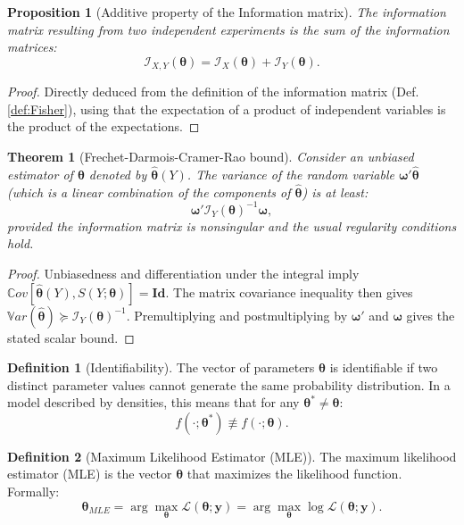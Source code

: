 \documentclass[
  11pt,
]{book}
\newtheorem{theorem}{Theorem}[chapter]
\newtheorem{proposition}{Proposition}[chapter]
\theoremstyle{definition}
\newtheorem{definition}{Definition}[chapter]
\theoremstyle{definition}
\theoremstyle{definition}
\theoremstyle{definition}
\theoremstyle{remark}
\begin{document}
\begin{proposition}[Additive property of the Information matrix]
\protect\hypertarget{prp:additiv}{}\label{prp:additiv}The information matrix resulting from two independent experiments is the sum of the information matrices:
\[
\mathcal{I}_{X,Y}(\boldsymbol\theta) = \mathcal{I}_X(\boldsymbol\theta) + \mathcal{I}_Y(\boldsymbol\theta).
\]
\end{proposition}

\begin{proof}
Directly deduced from the definition of the information matrix (Def. \ref{def:Fisher}), using that the expectation of a product of independent variables is the product of the expectations.
\end{proof}

\begin{theorem}[Frechet-Darmois-Cramer-Rao bound]
\protect\hypertarget{thm:FDCR}{}\label{thm:FDCR}Consider an unbiased estimator of \(\boldsymbol\theta\) denoted by \(\hat{\boldsymbol\theta}(Y)\). The variance of the random variable \(\boldsymbol\omega'\hat{\boldsymbol\theta}\) (which is a linear combination of the components of \(\hat{\boldsymbol\theta}\)) is at least:
\[
\boldsymbol\omega'\mathcal{I}_Y(\boldsymbol\theta)^{-1}\boldsymbol\omega,
\]
provided the information matrix is nonsingular and the usual regularity conditions hold.
\end{theorem}

\begin{proof}
Unbiasedness and differentiation under the integral imply \(\mathbb{C}ov[\hat{\boldsymbol\theta}(Y),S(Y;\boldsymbol\theta)]=\mathbf{Id}\). The matrix covariance inequality then gives \(\mathbb{V}ar(\hat{\boldsymbol\theta})\succeq\mathcal{I}_Y(\boldsymbol\theta)^{-1}\). Premultiplying and postmultiplying by \(\boldsymbol\omega'\) and \(\boldsymbol\omega\) gives the stated scalar bound.
\end{proof}

\begin{definition}[Identifiability]
\protect\hypertarget{def:identif}{}\label{def:identif}The vector of parameters \(\boldsymbol\theta\) is identifiable if two distinct parameter values cannot generate the same probability distribution. In a model described by densities, this means that for any \(\boldsymbol\theta^*\ne\boldsymbol\theta\):
\[
f(\cdot;\boldsymbol\theta^*)\not\equiv f(\cdot;\boldsymbol\theta).
\]
\end{definition}

\begin{definition}[Maximum Likelihood Estimator (MLE)]
\protect\hypertarget{def:MLEest}{}\label{def:MLEest}The maximum likelihood estimator (MLE) is the vector \(\boldsymbol\theta\) that maximizes the likelihood function. Formally:
\begin{equation}
\boldsymbol\theta_{MLE} = \arg \max_{\boldsymbol\theta} \mathcal{L}(\boldsymbol\theta;\mathbf{y})  = \arg \max_{\boldsymbol\theta} \log \mathcal{L}(\boldsymbol\theta;\mathbf{y}).\label{eq:MLEestimator}
\end{equation}
\end{definition}
\end{document}
